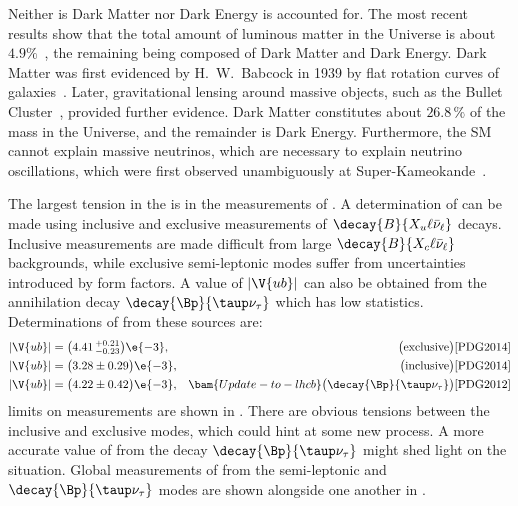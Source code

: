 Neither is Dark Matter nor Dark Energy is accounted for.
The most recent results show that the total amount of luminous matter in the Universe is about
$4.9\%$~\cite{Adam:2015rua,PDG2014}, the remaining being composed of Dark Matter and Dark Energy.
Dark Matter was first evidenced by H.~W.~Babcock in 1939 by flat rotation curves of
galaxies~\cite{1970ApJ...159..379R,1980ApJ...238..471R}.
Later, gravitational lensing around massive objects, such as the Bullet
Cluster~\cite{Markevitch:2003at}, provided further evidence.
Dark Matter constitutes about $26.8\,\%$ of the mass in the Universe, and the remainder is Dark
Energy.
Furthermore, the SM cannot explain massive neutrinos, which are necessary to explain neutrino
oscillations, which were first observed unambiguously at
Super-Kameokande~\cite{PhysRevLett.81.1562}.



The largest tension in the \ut is in  the measurements of .
A determination of  can be made using inclusive and exclusive measurements of
$\decay{B}{X_u\ell\bar\nu_\ell}$ decays.
Inclusive measurements are made difficult from large
$\decay{B}{X_c\ell\bar\nu_\ell}$ backgrounds, while exclusive semi-leptonic modes suffer from
uncertainties introduced by form factors.
A value of $\left|\V{ub}\right|$ can also be obtained from the annihilation decay
$\decay{\Bp}{\taup\nu_\tau}$ which has low statistics.
Determinations of  from these sources are:
\begin{align}
  |\V{ub}| &= \big(4.41\,^{+0.21}_{-0.23}\big)\e{-3}, & \quad\big(\mathrm{exclusive}\big)\text{\cite{PDG2014}}& \nonumber\\
  |\V{ub}| &= \big(3.28\pm{0.29}\big)\e{-3},  & \big(\mathrm{inclusive}\big)\text{\cite{PDG2014}}&\nonumber\\
  |\V{ub}| &= \big(4.22\pm{0.42}\big)\e{-3},  &
  \bam{Update-to-lhcb} \big(\decay{\Bp}{\taup\nu_\tau}\big)\text{\cite{PDG2012}}&\nonumber\\
  \label{eq:th:vub}
\end{align}
limits on \ut measurements are shown in .
There are obvious tensions between the inclusive and exclusive modes, which could hint at some new
process.
A more accurate value of  from the decay $\decay{\Bp}{\taup\nu_\tau}$ might shed light on the
situation.
Global measurements of  from the semi-leptonic and $\decay{\Bp}{\taup\nu_\tau}$
modes are shown alongside one another in .

